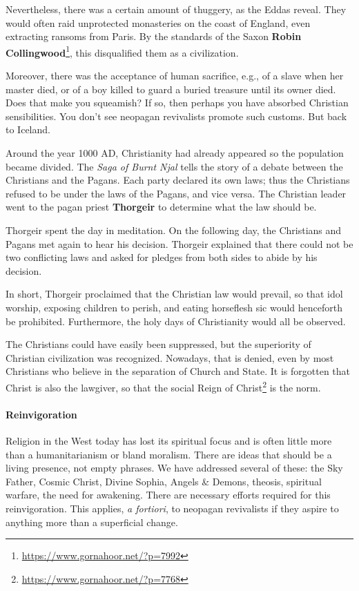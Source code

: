 Nevertheless, there was a certain amount of thuggery, as the Eddas reveal. They would often raid unprotected monasteries on the coast of England, even extracting ransoms from Paris. By the standards of the Saxon \textbf{Robin Collingwood}\footnote{\url{https://www.gornahoor.net/?p=7992}}, this disqualified them as a civilization.

Moreover, there was the acceptance of human sacrifice, e.g., of a slave when her master died, or of a boy killed to guard a buried treasure until its owner died. Does that make you squeamish? If so, then perhaps you have absorbed Christian sensibilities. You don't see neopagan revivalists promote such customs. But back to Iceland.

Around the year 1000 AD, Christianity had already appeared so the population became divided. The \emph{Saga of Burnt Njal} tells the story of a debate between the Christians and the Pagans. Each party declared its own laws; thus the Christians refused to be under the laws of the Pagans, and vice versa. The Christian leader went to the pagan priest \textbf{Thorgeir} to determine what the law should be.


Thorgeir spent the day in meditation. On the following day, the Christians and Pagans met again to hear his decision. Thorgeir explained that there could not be two conflicting laws and asked for pledges from both sides to abide by his decision.

In short, Thorgeir proclaimed that the Christian law would prevail, so that idol worship, exposing children to perish, and eating horseflesh sic would henceforth be prohibited. Furthermore, the holy days of Christianity would all be observed.

The Christians could have easily been suppressed, but the superiority of Christian civilization was recognized. Nowadays, that is denied, even by most Christians who believe in the separation of Church and State. It is forgotten that Christ is also the lawgiver, so that the social Reign of Christ\footnote{\url{https://www.gornahoor.net/?p=7768}} is the norm.

\paragraph{Reinvigoration}


Religion in the West today has lost its spiritual focus and is often little more than a humanitarianism or bland moralism. There are ideas that should be a living presence, not empty phrases. We have addressed several of these: the Sky Father, Cosmic Christ, Divine Sophia, Angels
\& Demons, theosis, spiritual warfare, the need for awakening. There are necessary efforts required for this reinvigoration. This applies, \emph{a fortiori}, to neopagan revivalists if they aspire to anything more than a superficial change.


